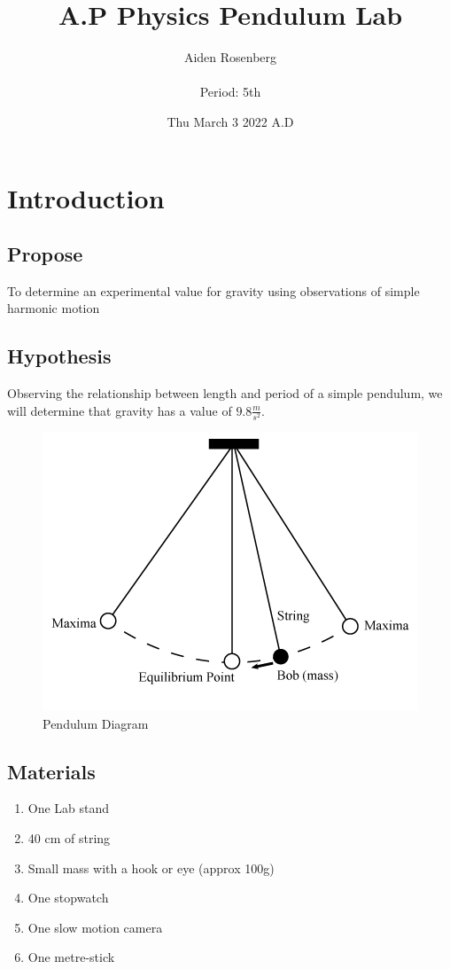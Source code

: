 \documentclass[11pt,letterpaper]{article}
\title{A.P Physics Pendulum Lab  }
\author{Aiden Rosenberg \\ \\ Period: 5th }
\date{Thu March 3 2022 A.D}
\begin{document}
\maketitle 


\pagebreak
\section{Introduction}

\subsection{Propose}
To determine an experimental value for gravity using observations of simple harmonic motion  

\subsection{Hypothesis}
Observing the relationship between length and period of a simple pendulum, we will determine that gravity has a value of $9.8 \frac{m}{s^2}$.

\begin{figure}
    \centering
  \includegraphics[width=0.5\linewidth]{Apparatus .png} 
    \caption{Pendulum Diagram}
    \label{fig:my_label}
\end{figure}


\subsection{Materials}

\begin{enumerate}
    \item One Lab stand
    \item 40 cm of string
    \item Small mass with a hook or eye (approx 100g) 
    \item One stopwatch 
    \item One slow motion camera
    \item One metre-stick
    \end{enumerate}
\pagebreak
\end{document}
